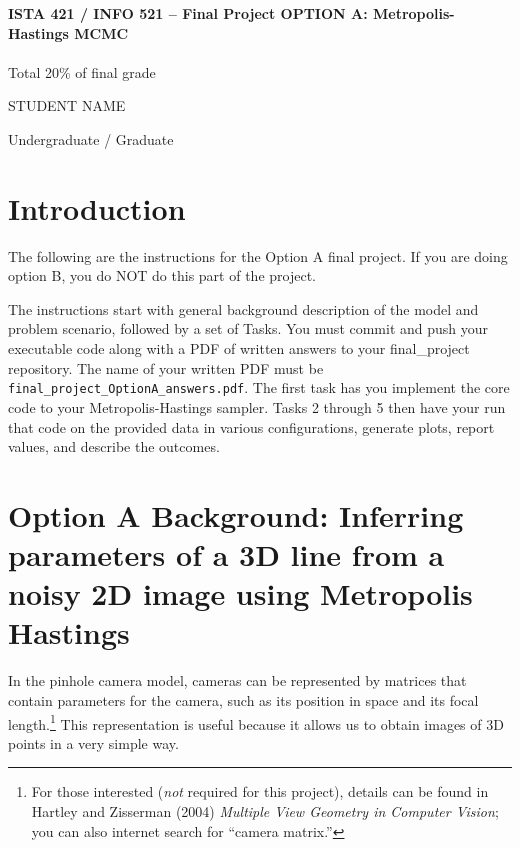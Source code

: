 \documentclass[10pt]{article}
\begin{document}
\begin{center}
    {\Large {\bf ISTA 421 / INFO 521 -- Final Project OPTION A: Metropolis-Hastings MCMC}} \\
     \\
    Total 20\% of final grade \\
    \vspace{1cm}
\end{center}

\begin{flushright}
STUDENT NAME %

Undergraduate / Graduate %
\end{flushright}

\section*{Introduction}

The following are the instructions for the Option A final project. If you are doing option B, you do NOT do this part of the project. 

The instructions start with general background description of the model and problem scenario, followed by a set of Tasks. You must commit and push your executable code along with a PDF of written answers to your final\_project repository. The name of your written PDF must be {\tt final\_project\_OptionA\_answers.pdf}. The first task has you implement the core code to your Metropolis-Hastings sampler. Tasks 2 through 5 then have your run that code on the provided data in various configurations, generate plots, report values, and describe the outcomes.

\section*{Option A Background: Inferring parameters of a 3D line from a noisy 2D image using Metropolis Hastings}

In the pinhole camera model, cameras can be represented by matrices that contain parameters for the camera, such as its position in space and its focal length.\footnote{For those interested ({\em not} required for this project), details can be found in Hartley and Zisserman (2004) {\em Multiple View Geometry in Computer Vision}; you can also internet search for ``camera matrix.''}  This representation is useful because it allows us to obtain images of 3D points in a very simple way.
\end{document}
